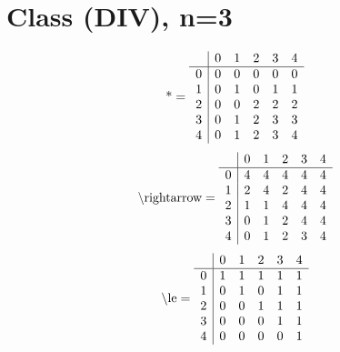 \documentclass[11pt]{article}
\begin{document}
\section{Class (DIV), n=3}
\[\text{*} = 
\begin{array}{r | r r r r r}
 & 0 & 1 & 2 & 3 & 4 \\ \hline
0 & 0 & 0 & 0 & 0 & 0 \\
1 & 0 & 1 & 0 & 1 & 1 \\
2 & 0 & 0 & 2 & 2 & 2 \\
3 & 0 & 1 & 2 & 3 & 3 \\
4 & 0 & 1 & 2 & 3 & 4 \\
\end{array}
\]
\[\text{\textbackslash rightarrow} = 
\begin{array}{r | r r r r r}
 & 0 & 1 & 2 & 3 & 4 \\ \hline
0 & 4 & 4 & 4 & 4 & 4 \\
1 & 2 & 4 & 2 & 4 & 4 \\
2 & 1 & 1 & 4 & 4 & 4 \\
3 & 0 & 1 & 2 & 4 & 4 \\
4 & 0 & 1 & 2 & 3 & 4 \\
\end{array}
\]
\[\text{\textbackslash le} = 
\begin{array}{r | r r r r r}
 & 0 & 1 & 2 & 3 & 4 \\ \hline
0 & 1 & 1 & 1 & 1 & 1 \\
1 & 0 & 1 & 0 & 1 & 1 \\
2 & 0 & 0 & 1 & 1 & 1 \\
3 & 0 & 0 & 0 & 1 & 1 \\
4 & 0 & 0 & 0 & 0 & 1 \\
\end{array}
\]
\end{document}
